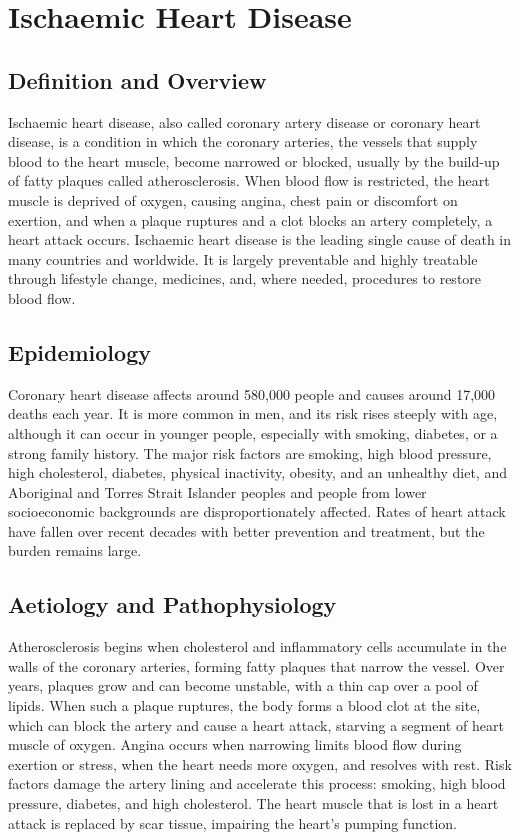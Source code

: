 \chapter{Ischaemic Heart Disease}

\section*{Definition and Overview}
Ischaemic heart disease, also called coronary artery disease or coronary heart disease, is a condition in which the coronary arteries, the vessels that supply blood to the heart muscle, become narrowed or blocked, usually by the build-up of fatty plaques called atherosclerosis. When blood flow is restricted, the heart muscle is deprived of oxygen, causing angina, chest pain or discomfort on exertion, and when a plaque ruptures and a clot blocks an artery completely, a heart attack occurs. Ischaemic heart disease is the leading single cause of death in many countries and worldwide. It is largely preventable and highly treatable through lifestyle change, medicines, and, where needed, procedures to restore blood flow.

\section*{Epidemiology}
Coronary heart disease affects around 580,000 people and causes around 17,000 deaths each year. It is more common in men, and its risk rises steeply with age, although it can occur in younger people, especially with smoking, diabetes, or a strong family history. The major risk factors are smoking, high blood pressure, high cholesterol, diabetes, physical inactivity, obesity, and an unhealthy diet, and Aboriginal and Torres Strait Islander peoples and people from lower socioeconomic backgrounds are disproportionately affected. Rates of heart attack have fallen over recent decades with better prevention and treatment, but the burden remains large.

\section*{Aetiology and Pathophysiology}
Atherosclerosis begins when cholesterol and inflammatory cells accumulate in the walls of the coronary arteries, forming fatty plaques that narrow the vessel. Over years, plaques grow and can become unstable, with a thin cap over a pool of lipids. When such a plaque ruptures, the body forms a blood clot at the site, which can block the artery and cause a heart attack, starving a segment of heart muscle of oxygen. Angina occurs when narrowing limits blood flow during exertion or stress, when the heart needs more oxygen, and resolves with rest. Risk factors damage the artery lining and accelerate this process: smoking, high blood pressure, diabetes, and high cholesterol. The heart muscle that is lost in a heart attack is replaced by scar tissue, impairing the heart's pumping function.

